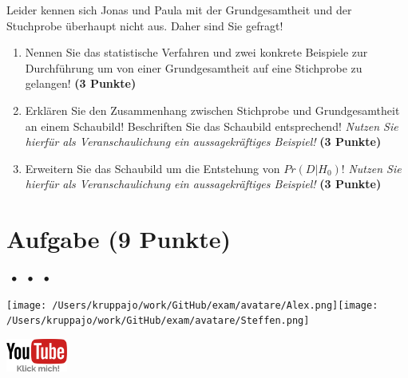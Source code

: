 \documentclass[a4paper, 9pt]{scrartcl}\usepackage[]{graphicx}\usepackage[]{xcolor}
\begin{document}
\vspace{1ex}

Leider kennen sich Jonas und Paula mit der Grundgesamtheit und der Stuchprobe überhaupt nicht aus. Daher sind Sie gefragt!

\begin{enumerate}
\item Nennen Sie das statistische Verfahren und zwei konkrete Beispiele zur Durchführung um von einer Grundgesamtheit auf eine Stichprobe zu gelangen! \textbf{(3 Punkte)}
\item Erklären Sie den Zusammenhang zwischen Stichprobe und Grundgesamtheit an einem Schaubild! Beschriften Sie das Schaubild entsprechend!
  \textit{Nutzen Sie hierfür als Veranschaulichung ein aussagekräftiges Beispiel!}  \textbf{(3 Punkte)}
\item Erweitern Sie das Schaubild um die Entstehung von $Pr(D|H_0)$! \textit{Nutzen Sie hierfür als Veranschaulichung ein aussagekräftiges Beispiel!}  \textbf{(3 Punkte)}
\end{enumerate} 
\clearpage

\section{Aufgabe \hfill (9 Punkte)}


 
\ifcollection
\begin{flushright}
\tiny
\textbf{\examinhaltstart}
\exammodulestat $\;\bullet$
\exammodulestatbbv $\;\bullet$
\exammodulestatversuch $\;\bullet$
\exammodulebiostat
\vspace{-4Ex}
\end{flushright}
\begin{minipage}[t]{0.5\textwidth}
\texttt{[image: /Users/kruppajo/work/GitHub/exam/avatare/Alex.png]}\hspace{-4mm}\texttt{[image: /Users/kruppajo/work/GitHub/exam/avatare/Steffen.png]}
\end{minipage}
\begin{minipage}[t]{0.5\textwidth}
\hfill
\href{https://youtu.be/Ric8ne39DtI}{\includegraphics[width = 2cm]{img/youtube}}
\end{minipage}
\fi
\end{document}
